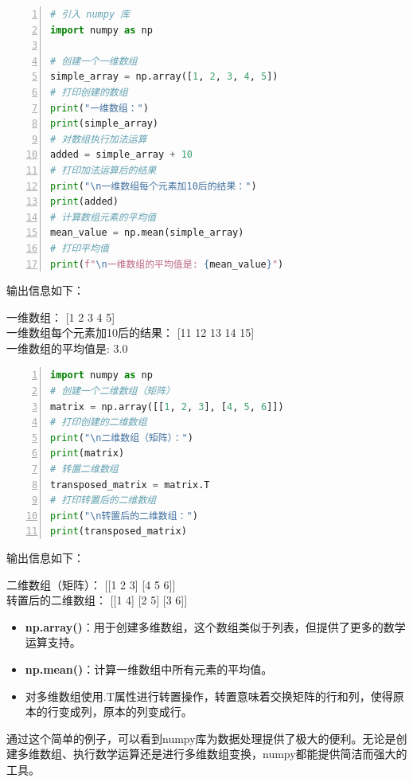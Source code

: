 \begin{lstlisting}[language={python},label={Numpy简单操作1},caption={Numpy简单操作1}, basicstyle=\footnotesize\ttfamily, breaklines=true, numbers=left, frame=single,keepspaces=true,showstringspaces=false]
# 引入 numpy 库
import numpy as np

# 创建一个一维数组
simple_array = np.array([1, 2, 3, 4, 5])
# 打印创建的数组
print("一维数组：")
print(simple_array)
# 对数组执行加法运算
added = simple_array + 10
# 打印加法运算后的结果
print("\n一维数组每个元素加10后的结果：")
print(added)
# 计算数组元素的平均值
mean_value = np.mean(simple_array)
# 打印平均值
print(f"\n一维数组的平均值是: {mean_value}")
\end{lstlisting}
输出信息如下：
\vspace{-3mm} %
\begin{tcolorbox}[colframe=blue!50!black, colback=blue!10!white, coltitle=black, sharp corners, top=0mm, bottom=0mm, boxrule=0.8mm]
一维数组：
[1 2 3 4 5]\\

一维数组每个元素加10后的结果：
[11 12 13 14 15]\\

一维数组的平均值是: 3.0\\
\end{tcolorbox}


\begin{lstlisting}[language={python},label={Numpy简单操作2},caption={Numpy简单操作2}, basicstyle=\footnotesize\ttfamily, breaklines=true, numbers=left, frame=single,keepspaces=true,showstringspaces=false]
import numpy as np
# 创建一个二维数组（矩阵）
matrix = np.array([[1, 2, 3], [4, 5, 6]])
# 打印创建的二维数组
print("\n二维数组（矩阵）：")
print(matrix)
# 转置二维数组
transposed_matrix = matrix.T
# 打印转置后的二维数组
print("\n转置后的二维数组：")
print(transposed_matrix)

\end{lstlisting}

输出信息如下：
\vspace{-3mm} %
\begin{tcolorbox}[colframe=blue!50!black, colback=blue!10!white, coltitle=black, sharp corners, top=0mm, bottom=0mm, boxrule=0.8mm]
二维数组（矩阵）：
[[1 2 3]
 [4 5 6]]\\

转置后的二维数组：
[[1 4]
 [2 5]
 [3 6]]
\end{tcolorbox}
\vspace{-3mm} %
\begin{itemize}
    \item \textbf{np.array()}：用于创建多维数组，这个数组类似于列表，但提供了更多的数学运算支持。
    \item \textbf{np.mean()}：计算一维数组中所有元素的平均值。
    \item 对多维数组使用.T属性进行转置操作，转置意味着交换矩阵的行和列，使得原本的行变成列，原本的列变成行。
\end{itemize}
通过这个简单的例子，可以看到numpy库为数据处理提供了极大的便利。无论是创建多维数组、执行数学运算还是进行多维数组变换，numpy都能提供简洁而强大的工具。


